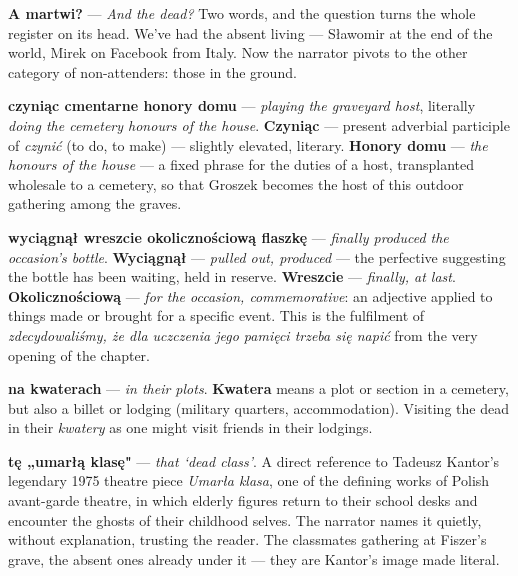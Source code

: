 \textbf{A martwi?} --- \textit{And the dead?} Two words, and the
question turns the whole register on its head. We've had the absent
living --- Sławomir at the end of the world, Mirek on Facebook from
Italy. Now the narrator pivots to the other category of non-attenders:
those in the ground.

\textbf{czyniąc cmentarne honory domu} --- \textit{playing the
graveyard host}, literally \textit{doing the cemetery honours of the
house}. \textbf{Czyniąc} --- present adverbial participle of
\textit{czynić} (to do, to make) --- slightly elevated, literary.
\textbf{Honory domu} --- \textit{the honours of the house} --- a fixed
phrase for the duties of a host, transplanted wholesale to a cemetery,
so that Groszek becomes the host of this outdoor gathering among the
graves.

\textbf{wyciągnął wreszcie okolicznościową flaszkę} --- \textit{finally
produced the occasion's bottle}. \textbf{Wyciągnął} --- \textit{pulled
out, produced} --- the perfective suggesting the bottle has been
waiting, held in reserve. \textbf{Wreszcie} --- \textit{finally, at
last}. \textbf{Okolicznościową} --- \textit{for the occasion,
commemorative}: an adjective applied to things made or brought for a
specific event. This is the fulfilment of \textit{zdecydowaliśmy, że
dla uczczenia jego pamięci trzeba się napić} from the very opening of
the chapter.

\textbf{na kwaterach} --- \textit{in their plots}. \textbf{Kwatera}
means a plot or section in a cemetery, but also a billet or lodging
(military quarters, accommodation). Visiting the dead in their
\textit{kwatery} as one might visit friends in their lodgings.

\textbf{tę „umarłą klasę"} --- \textit{that `dead class'}. A direct
reference to Tadeusz Kantor's legendary 1975 theatre piece
\textit{Umarła klasa}, one of the defining works of Polish
avant-garde theatre, in which elderly figures return to their school
desks and encounter the ghosts of their childhood selves. The narrator
names it quietly, without explanation, trusting the reader. The
classmates gathering at Fiszer's grave, the absent ones already under
it --- they are Kantor's image made literal.



